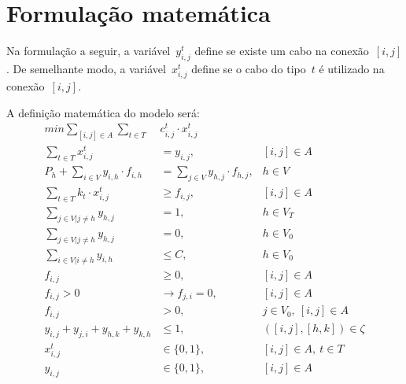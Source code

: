 \section{Formulação matemática}


Na formulação a seguir, a variável~$y_{i, j}^{t}$ define se existe um cabo na conexão~$[i, j]$.
De semelhante modo, a variável~$x_{i, j}^{t}$ define se o cabo do tipo~$t$ é utilizado na conexão~$[i, j]$.

A definição matemática do modelo será:~
\begin{align}
  min \sum_{[i, j] \in A} \sum_{t \in T}& c_{i, j}^{t} \cdot x_{i, j}^{t} \label{eq:objetivo}
  \\
  \sum_{t \in T} x_{i, j}^{t} &= y_{i, j}, &[i, j] \in A \label{eq:num-conexoes}
  \\
  P_{h} + \sum_{i \in V} y_{i, h} \cdot f_{i, h} &= \sum_{j \in V} y_{h, j} \cdot f_{h, j}, &h \in V \label{eq:conservacao}
  \\
  \sum_{t \in T} k_{t} \cdot x_{i, j}^{t} &\geq f_{i, j}, &[i, j] \in A \label{eq:limite-cabo}
  \\
  \sum_{j \in V | j \neq h} y_{h, j} &= 1, &h \in V_{T} \label{eq:deve-conectar}
  \\
  \sum_{j \in V | j \neq h} y_{h, j} &= 0, &h \in V_{0} \label{eq:sub-nao-conectar}
  \\
  \sum_{i \in V | i \neq h} y_{i, h} &\leq C, &h \in V_{0} \label{eq:limite-subestacao}
  \\
  f_{i, j} &\geq 0, &[i, j] \in A \label{eq:fluxo}
  \\
  f_{i, j} > 0 &\rightarrow f_{j, i} = 0, &[i, j] \in A \label{eq:fluxo-dir}
  \\
  f_{i, j} &> 0, &j \in V_{0},\ [i, j] \in A \label{eq:fluxo-chega-sub}
  \\
  y_{i, j} + y_{j, i} + y_{h, k} + y_{k, h} &\leq 1, &([i, j], [h, k]) \in \zeta \label{eq:cruzamento}
  \\
  x_{i, j}^{t} &\in \{0, 1\}, &[i, j] \in A,\ t \in T \label{eq:num-conexoes-cabo-t}
  \\
  y_{i, j} &\in \{0, 1\}, &[i, j] \in A \label{eq:tem-conexao}
\end{align}

